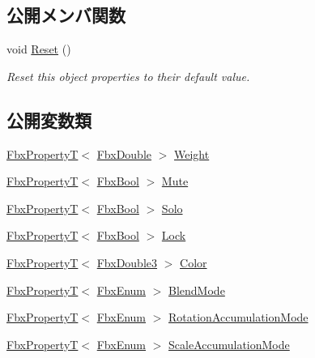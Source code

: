 \subsection*{公開メンバ関数}
\begin{DoxyCompactItemize}
\item 
void \hyperlink{class_fbx_anim_layer_acd87646f48b6387952fd3ca257133774}{Reset} ()
\begin{DoxyCompactList}\small\item\em Reset this object properties to their default value. \end{DoxyCompactList}\end{DoxyCompactItemize}
\subsection*{公開変数類}
\begin{DoxyCompactItemize}
\item 
\hyperlink{class_fbx_property_t}{Fbx\+PropertyT}$<$ \hyperlink{fbxtypes_8h_a171e72a1c46fc15c1a6c9c31948c1c5b}{Fbx\+Double} $>$ \hyperlink{class_fbx_anim_layer_a6ab882a24bdf15c3448d064955bf0535}{Weight}
\item 
\hyperlink{class_fbx_property_t}{Fbx\+PropertyT}$<$ \hyperlink{fbxtypes_8h_a92e0562b2fe33e76a242f498b362262e}{Fbx\+Bool} $>$ \hyperlink{class_fbx_anim_layer_ae8f8f6db5f57e41d42935720b4e8d582}{Mute}
\item 
\hyperlink{class_fbx_property_t}{Fbx\+PropertyT}$<$ \hyperlink{fbxtypes_8h_a92e0562b2fe33e76a242f498b362262e}{Fbx\+Bool} $>$ \hyperlink{class_fbx_anim_layer_a0e002d0db3b5998a4c016cffb7f5c252}{Solo}
\item 
\hyperlink{class_fbx_property_t}{Fbx\+PropertyT}$<$ \hyperlink{fbxtypes_8h_a92e0562b2fe33e76a242f498b362262e}{Fbx\+Bool} $>$ \hyperlink{class_fbx_anim_layer_ade773868b910bcfcedf4818b96da9233}{Lock}
\item 
\hyperlink{class_fbx_property_t}{Fbx\+PropertyT}$<$ \hyperlink{fbxtypes_8h_ae0a96f14cde566774c7553aa7523b7a7}{Fbx\+Double3} $>$ \hyperlink{class_fbx_anim_layer_a9eb1d3e6e4bcfc59122fe6261eb529bc}{Color}
\item 
\hyperlink{class_fbx_property_t}{Fbx\+PropertyT}$<$ \hyperlink{fbxtypes_8h_a9a28614cb4272a0ad7d748eda7f3d3e5}{Fbx\+Enum} $>$ \hyperlink{class_fbx_anim_layer_a7e4d4d009aa2c248d19781e9d31f1f89}{Blend\+Mode}
\item 
\hyperlink{class_fbx_property_t}{Fbx\+PropertyT}$<$ \hyperlink{fbxtypes_8h_a9a28614cb4272a0ad7d748eda7f3d3e5}{Fbx\+Enum} $>$ \hyperlink{class_fbx_anim_layer_ae8d47b5fabab90773e9a40aeef934945}{Rotation\+Accumulation\+Mode}
\item 
\hyperlink{class_fbx_property_t}{Fbx\+PropertyT}$<$ \hyperlink{fbxtypes_8h_a9a28614cb4272a0ad7d748eda7f3d3e5}{Fbx\+Enum} $>$ \hyperlink{class_fbx_anim_layer_a50ec8bebaa1241cc168fae6bcf5c670f}{Scale\+Accumulation\+Mode}
\end{DoxyCompactItemize}
